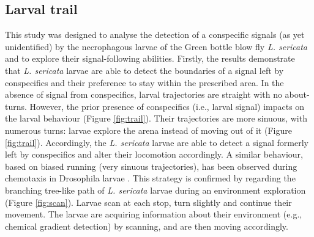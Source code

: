 			\subsection{Larval trail}
This study was designed to analyse the detection of a conspecific signals (as yet unidentified) by the necrophagous larvae of the Green bottle blow fly \textit{L. sericata} and to explore their signal-following abilities. Firstly, the results demonstrate that \textit{L. sericata} larvae are able to detect the boundaries of a signal left by conspecifics and their preference to stay within the prescribed area.  In the absence of signal from conspecifics, larval trajectories are straight with no about-turns. However, the prior presence of conspecifics (i.e., larval signal) impacts on the larval behaviour (Figure \ref{fig:trail}). Their trajectories are more sinuous, with numerous turns: larvae explore the arena instead of moving out of it (Figure \ref{fig:trail}). Accordingly, the \textit{L. sericata} larvae are able to detect a signal formerly left by conspecifics and alter their locomotion accordingly. A similar behaviour, based on biased running (very sinuous trajectories), has been observed during chemotaxis in Drosophila larvae \citep{gomez-marin_active_2011, gomez-marin_active_2012, ohashi_novel_2014}. This strategy is confirmed by regarding the branching tree-like path of \textit{L. sericata} larvae during an environment exploration (Figure \ref{fig:scan}). Larvae scan at each stop, turn slightly and continue their movement. The larvae are acquiring information about their environment (e.g., chemical gradient detection) by scanning, and are then moving accordingly.            
